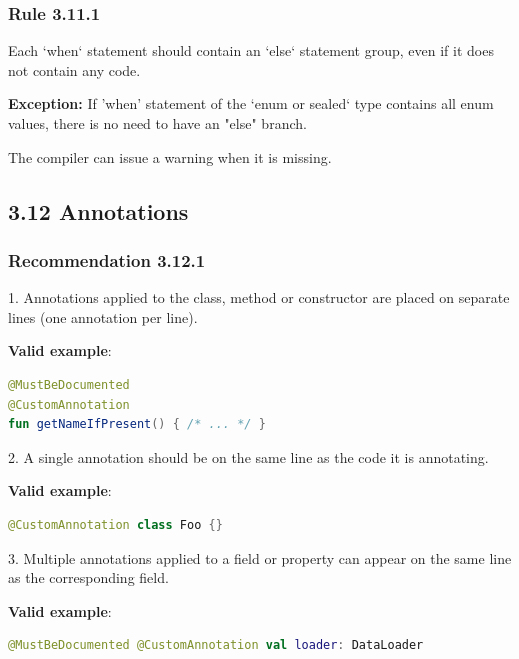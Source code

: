 {{{{\subsubsection*{\textbf{Rule 3.11.1}}
\leavevmode\newline

Each `when` statement should contain an `else` statement group, even if it does not contain any code.



\textbf{Exception:} If 'when' statement of the `enum or sealed` type contains all enum values, there is no need to have an "else" branch.

The compiler can issue a warning when it is missing.



\subsection*{\textbf{3.12 Annotations}}

\subsubsection*{\textbf{Recommendation 3.12.1}}
\leavevmode\newline



1. Annotations applied to the class, method or constructor are placed on separate lines (one annotation per line).



\textbf{Valid example}:

\begin{lstlisting}[language=Kotlin]
@MustBeDocumented
@CustomAnnotation
fun getNameIfPresent() { /* ... */ }
\end{lstlisting}


2. A single annotation should be on the same line as the code it is annotating.



\textbf{Valid example}:

\begin{lstlisting}[language=Kotlin]
@CustomAnnotation class Foo {}
\end{lstlisting}


3. Multiple annotations applied to a field or property can appear on the same line as the corresponding field.



\textbf{Valid example}:

\begin{lstlisting}[language=Kotlin]
@MustBeDocumented @CustomAnnotation val loader: DataLoader
\end{lstlisting}


}}}}

